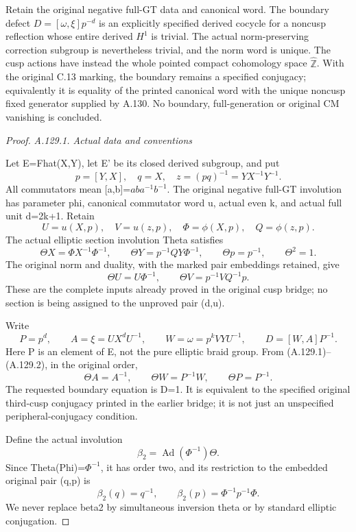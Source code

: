 Retain the original negative full-GT data and canonical word.
The boundary defect \(D=[\omega,\xi]p^{-d}\) is an explicitly
specified derived cocycle for a noncusp reflection whose entire
derived \(H^1\) is trivial. The actual norm-preserving correction
subgroup is nevertheless trivial, and the norm word is unique.
The cusp actions have instead the whole pointed compact cohomology
space \(\widehat{\mathbb Z}\). With the original C.13 marking, the
boundary remains a specified conjugacy; equivalently it is equality
of the printed canonical word with the unique noncusp fixed generator
supplied by A.130. No boundary, full-generation or original CM
vanishing is concluded.
\begin{proof}
\emph{A.129.1. Actual data and conventions}

Let E=Fhat(X,Y), let E' be its closed derived subgroup, and put
\[
 p=[Y,X],\quad q=X,\quad z=(pq)^{-1}=YX^{-1}Y^{-1}.
\]
All commutators mean [a,b]=\(aba^{-1}\)\(b^{-1}\). The original negative full-GT involution has parameter phi, canonical commutator word u, actual even k, and actual full unit d=2k+1. Retain
\[
 U=u(X,p),\quad V=u(z,p),\quad\Phi=\phi(X,p),\quad Q=\phi(z,p).
\]
The actual elliptic section involution Theta satisfies
\[
 \Theta X=\Phi X^{-1}\Phi^{-1},\qquad
 \Theta Y=p^{-1}QY\Phi^{-1},\qquad
 \Theta p=p^{-1},\qquad\Theta^2=1.
\tag{A.129.1}
\]
The original norm and duality, with the marked pair embeddings retained, give
\[
 \Theta U=U\Phi^{-1},\qquad
 \Theta V=p^{-1}VQ^{-1}p.
\tag{A.129.2}
\]
These are the complete inputs already proved in the original cusp bridge; no section is being assigned to the unproved pair (d,u).

Write
\[
 P=p^d,\qquad A=\xi=UX^dU^{-1},\qquad
 W=\omega=p^kVYU^{-1},\qquad D=[W,A]P^{-1}.
\tag{A.129.3}
\]
Here P is an element of E, not the pure elliptic braid group. From (A.129.1)--(A.129.2), in the original order,
\[
 \Theta A=A^{-1},\qquad\Theta W=P^{-1}W,
 \qquad\Theta P=P^{-1}.
\tag{A.129.4}
\]
The requested boundary equation is D=1. It is equivalent to the specified original third-cusp conjugacy printed in the earlier bridge; it is not just an unspecified peripheral-conjugacy condition.

Define the actual involution
\[
 \beta_2=\operatorname{Ad}(\Phi^{-1})\Theta.
\]
Since Theta(Phi)=\(\Phi^{-1}\), it has order two, and its restriction to the embedded original pair (q,p) is
\[
 \beta_2(q)=q^{-1},\qquad
 \beta_2(p)=\Phi^{-1}p^{-1}\Phi.
\tag{A.129.5}
\]
We never replace beta2 by simultaneous inversion theta or by standard elliptic conjugation.


\end{proof}
